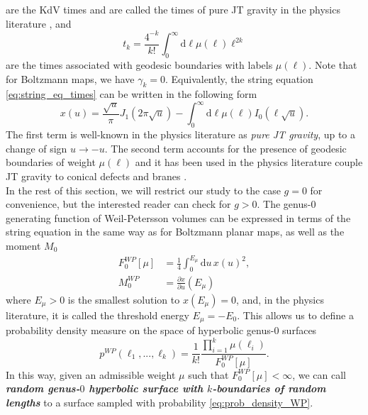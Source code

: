 \documentclass[a4paper,11pt]{article}
\newcommand{\rmd}{\mathrm{d}}
\begin{document}
are the KdV times \cite{1996CMaPh.181..763K, Mirzakhani} and are called the times of pure JT gravity in the physics literature \cite{Johnson:2019eik,Okuyama:2019xbv}, and
\begin{equation}
    t_k=\frac{4^{-k}}{k!}\int_0^\infty \rmd \ell \mu(\ell) \ell^{2k}\label{eq:def_general_JT_times}
\end{equation}
are the times associated with geodesic boundaries with labels $\mu(\ell)$. Note that for Boltzmann maps, we have $\gamma_k=0$.
 Equivalently, the string equation \eqref{eq:string_eq_times} can be written in the following form 
\begin{equation}
    x(u)=\frac{\sqrt{u}}{\pi}J_1\left(2\pi\sqrt{u}\right)-\int_0^\infty \rmd\ell \mu(\ell) I_0\left(\ell \sqrt{u}\right).\label{eq:general_string_eq_JT}
\end{equation}
The first term is well-known in the physics literature as \textit{pure JT gravity}, up to a change of sign $u\rightarrow -u$. The second term accounts for the presence of geodesic boundaries of weight $\mu(\ell)$ and it has been used in the physics literature couple JT gravity to conical defects and branes \cite{Turi:2020ale,Okuyama:2021FZZT,Gao:2021uro}.\\
In the rest of this section, we will restrict our study to the case $g=0$ for convenience, but the interested reader can check \cite{budd2022irreducible,budd2023_2} for $g>0$. The genus-$0$ generating function of Weil-Petersson volumes can be expressed in terms of the string equation in the same way as for Boltzmann planar maps, as well as the moment $M_0$ \cite{budd2022irreducible}
\begin{align}
    	F^{WP}_0[\mu] &= \frac{1}{4}\int_{0}^{E_\mu} \!\!\!\rmd u\, x(u)^2,\label{eq:genfun0}\\
    M^{WP}_0&=\frac{\partial x}{\partial u} (E_\mu)\label{eq:m0_wp}
\end{align}
where $E_\mu>0$ is the smallest solution to $x(E_\mu)=0$, and, in the physics literature, it is called the threshold energy $E_\mu=-E_0$.  This allows us to define a probability density measure on the space of hyperbolic genus-$0$ surfaces  
\begin{equation}
    p^{WP}\left(\ell_1, ... , \ell_k\right) = \frac{1}{k!} \frac{\prod_{i=1}^{k}  \mu(\ell_i)}{F^{WP}_0[\mu]}.
\label{eq:prob_density_WP}
\end{equation}
In this way, given an admissible weight $\mu$ such that $F^{WP}_0[\mu]<\infty$, we can call \textbf{\textit{random genus-$0$ hyperbolic surface with $k$-boundaries of random lengths}} to a surface sampled with probability \eqref{eq:prob_density_WP}.\\
\end{document}
